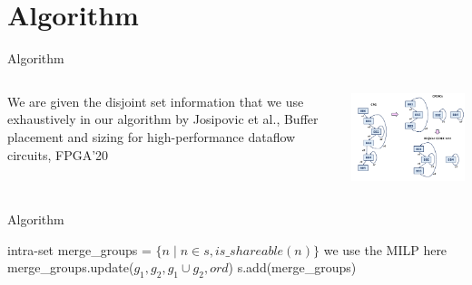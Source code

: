 \documentclass{beamer}
\begin{document}
\section{Algorithm}
\begin{frame}{Algorithm}
\begin{columns}

\end{columns}
    \begin{columns}[T]
    \begin{column}{0.45\textwidth}
We are given the disjoint set information that we use exhaustively in our algorithm by Josipovic et al., Buffer placement and sizing for high-performance dataflow circuits, FPGA'20
\end{column}
    \begin{column}{0.45\textwidth}
    \begin{center}
     \includegraphics[scale=0.4]{input_algorithm.png}
    \end{center}
    \end{column}
\end{columns}
\end{frame}

\begin{frame}[fragile]{Algorithm}
 \small
 \scriptsize
\begin{algorithmic}[1]
    \LineComment intra-set
            \State merge\_groups = $\{ n \mid n \in s, is\_shareable(n)\}$
            \Do
                            \LineComment we use the MILP here
                                \State merge\_groups.update($g_1, g_2, g_1 \cup g_2, ord$) 
                            \EndIf
                        \EndFor
                    \EndIf
                \EndFor
            \State s.add(merge\_groups)
        \EndFor
    \EndFor
\end{algorithmic}
\end{frame}
\end{document}
